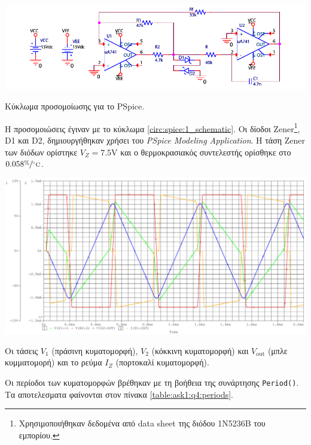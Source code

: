 \begin{center}
	\begin{circuitfig}[H]
		\includegraphics[width=15cm]{spice_01/schematic.pdf}
		\caption{Κύκλωμα προσομοίωσης για το PSpice.}
		\label{circ:spice:1_schematic}
	\end{circuitfig}
\end{center}

Η προσομοιώσεις έγιναν με το κύκλωμα \ref{circ:spice:1_schematic}. Οι δίοδοι Zener\footnote{Χρησιμοποιήθηκαν δεδομένα από data sheet της διόδου 1N5236B του εμπορίου.}, D1 και D2, δημιουργήθηκαν χρήσει του \textsl{PSpice Modeling Application}. Η τάση Zener των διόδων ορίστηκε $V_Z=7.5\unit{\volt}$ και ο θερμοκρασιακός συντελεστής ορίσθηκε στο $0.058\displaystyle{\sfrac{\%}{\unit{\celsius}}}$.


\begin{chart}[H]
	\begin{center}
		\includegraphics[width=15cm]{spice_01/q4cropped.pdf}
		\caption{Οι τάσεις $V_1$ (πράσινη κυματομορφή), $V_2$ (κόκκινη κυματομορφή) και $V_{\mathrm{out}}$ (μπλε κυμματομορή) και το ρεύμα $I_Z$ (πορτοκαλί κυματομορφή).}
		\label{plot:ask1:q4}
	\end{center}
\end{chart}

Οι περίοδοι των κυματομορφών βρέθηκαν με τη βοήθεια της συνάρτησης \texttt{Period()}. Τα αποτελεσματα φαίνονται στον πίνακα \ref{table:ask1:q4:periods}.

